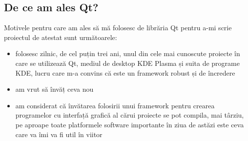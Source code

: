 \subsection{De ce am ales Qt?}
Motivele pentru care am ales să mă folosesc de librăria Qt pentru a-mi scrie proiectul de atestat sunt următoarele:
\begin{itemize}
 \item folosesc zilnic, de cel puțin trei ani, unul din cele mai cunoscute proiecte în care se utilizează Qt, mediul de desktop KDE Plasma și suita de programe KDE, lucru care m-a convins că este un framework robust și de încredere
 \item am vrut să învăț ceva nou
 \item am considerat că învătarea folosirii unui framework pentru crearea programelor cu interfață grafică al cărui proiecte se pot compila, mai târziu, pe aproape toate platformele software importante în ziua de astăzi este ceva care va îmi va fi util în viitor
\end{itemize}
